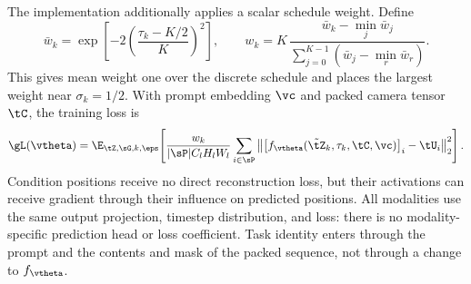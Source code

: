 The implementation additionally applies a scalar schedule weight. Define
\begin{equation}
    \bar w_k=\exp\!\left[-2\left(\frac{\tau_k-K/2}{K}\right)^2\right],
    \qquad
    w_k=K\,
    \frac{\bar w_k-\min_j\bar w_j}
         {\sum_{j=0}^{K-1}(\bar w_j-\min_r\bar w_r)}.
    \label{eq:prelim-timestep-weight}
\end{equation}
This gives mean weight one over the discrete schedule and places the largest weight near
$\sigma_k=1/2$. With prompt embedding $\vc$ and packed camera tensor $\tC$, the training loss is
\begin{equation}
    \gL(\vtheta)
    =\E_{\tZ,\sG,k,\eps}\!\left[
      \frac{w_k}{|\sP|C_lH_lW_l}
      \sum_{i\in\sP}
      \left\|
        \left[f_{\vtheta}(\tilde\tZ_k,\tau_k,\tC,\vc)\right]_i
        -\tU_i
      \right\|_2^2
    \right].
    \label{eq:prelim-loss}
\end{equation}
Condition positions receive no direct reconstruction loss, but their activations can receive
gradient through their influence on predicted positions. All modalities use the same output
projection, timestep distribution, and loss: there is no modality-specific prediction head or
loss coefficient. Task identity enters through the prompt and the contents and mask of the packed
sequence, not through a change to $f_{\vtheta}$.
